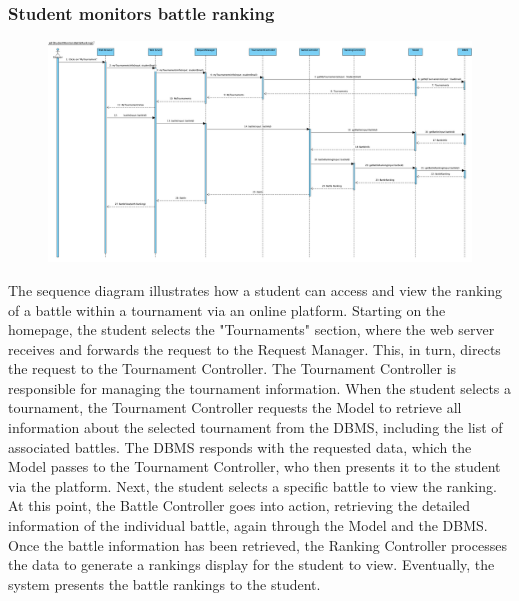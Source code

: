 \subsubsection{Student monitors battle ranking}
\begin{figure}[H]
    \centering
    \includegraphics[width=1\textwidth]{SequenceDiagram/StudentMonitorsBattleRanking.png}
    \label{fig:enter-label}
\end{figure}
The sequence diagram illustrates how a student can access and view the ranking of a battle within a tournament via an online platform. Starting on the homepage, the student selects the "Tournaments" section, where the web server receives and forwards the request to the Request Manager. This, in turn, directs the request to the Tournament Controller.
The Tournament Controller is responsible for managing the tournament information. When the student selects a tournament, the Tournament Controller requests the Model to retrieve all information about the selected tournament from the DBMS, including the list of associated battles. The DBMS responds with the requested data, which the Model passes to the Tournament Controller, who then presents it to the student via the platform.
Next, the student selects a specific battle to view the ranking. At this point, the Battle Controller goes into action, retrieving the detailed information of the individual battle, again through the Model and the DBMS. 
Once the battle information has been retrieved, the Ranking Controller processes the data to generate a rankings display for the student to view. 
Eventually, the system presents the battle rankings to the student.
